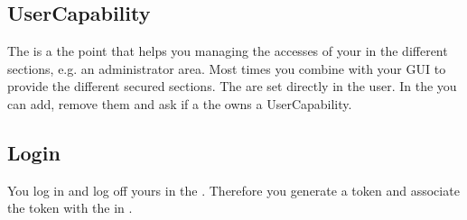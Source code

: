 \subsection{UserCapability}
The  is a the point that helps you managing the accesses of your  in the different sections, e.g. an administrator area. Most times you combine  with your GUI to provide the different secured sections.
The  are set directly in the user. In the  you can add, remove them and ask if a the  owns a \code
{UserCapability}.


\subsection{Login}

You log in and log off yours in the . Therefore you generate a token and associate the token with the  in 
.




